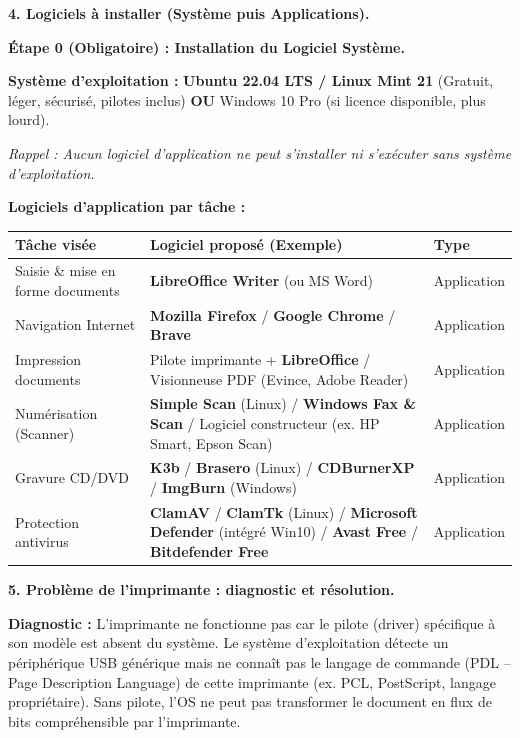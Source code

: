 \documentclass[11pt]{article}
\newcommand{\cle}[1]{{\popxbold\color{popdark}#1}}
\begin{document}
\begin{exoresolu}
\textbf{4. Logiciels à installer (Système puis Applications).}

\textbf{Étape 0 (Obligatoire) : Installation du Logiciel Système.}
\begin{center}
\textbf{Système d'exploitation :} \textbf{Ubuntu 22.04 LTS / Linux Mint 21} (Gratuit, léger, sécurisé, pilotes inclus) \textbf{OU} Windows 10 Pro (si licence disponible, plus lourd).
\end{center}
\emph{Rappel : Aucun logiciel d'application ne peut s'installer ni s'exécuter sans système d'exploitation.}

\textbf{Logiciels d'application par tâche :}

\begin{center}
\begin{tabularx}{\linewidth}{|>{\raggedright\arraybackslash}X|>{\raggedright\arraybackslash}X|l|}
\hline
\rowcolor{popblueL} \textbf{Tâche visée} & \textbf{Logiciel proposé (Exemple)} & \textbf{Type} \\
\hline
Saisie \& mise en forme documents & \textbf{LibreOffice Writer} (ou MS Word) & Application \\
\hline
Navigation Internet & \textbf{Mozilla Firefox} / \textbf{Google Chrome} / \textbf{Brave} & Application \\
\hline
Impression documents & Pilote imprimante + \textbf{LibreOffice} / Visionneuse PDF (Evince, Adobe Reader) & Application \\
\hline
Numérisation (Scanner) & \textbf{Simple Scan} (Linux) / \textbf{Windows Fax \& Scan} / Logiciel constructeur (ex. HP Smart, Epson Scan) & Application \\
\hline
Gravure CD/DVD & \textbf{K3b} / \textbf{Brasero} (Linux) / \textbf{CDBurnerXP} / \textbf{ImgBurn} (Windows) & Application \\
\hline
Protection antivirus & \textbf{ClamAV} / \textbf{ClamTk} (Linux) / \textbf{Microsoft Defender} (intégré Win10) / \textbf{Avast Free} / \textbf{Bitdefender Free} & Application \\
\hline
\end{tabularx}
\end{center}

\textbf{5. Problème de l'imprimante : diagnostic et résolution.}

\textbf{Diagnostic :} L'imprimante ne fonctionne pas car le \cle{pilote} (driver) spécifique à son modèle est absent du système. Le système d'exploitation détecte un périphérique USB générique mais ne connaît pas le langage de commande (PDL -- Page Description Language) de cette imprimante (ex. PCL, PostScript, langage propriétaire). Sans pilote, l'OS ne peut pas transformer le document en flux de bits compréhensible par l'imprimante.


\end{exoresolu}
\end{document}
